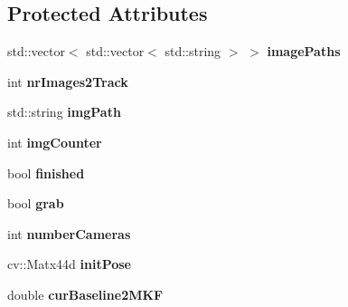 \subsection*{Protected Attributes}
\begin{DoxyCompactItemize}
\item 
std\+::vector$<$ std\+::vector$<$ std\+::string $>$ $>$ {\bfseries image\+Paths}\hypertarget{classMultiColSLAM_1_1cTracking_a0fba31f00a49e1e843390d844c3177c0}{}\label{classMultiColSLAM_1_1cTracking_a0fba31f00a49e1e843390d844c3177c0}

\item 
int {\bfseries nr\+Images2\+Track}\hypertarget{classMultiColSLAM_1_1cTracking_a69cbd301b745115cda11877f5b8ccd51}{}\label{classMultiColSLAM_1_1cTracking_a69cbd301b745115cda11877f5b8ccd51}

\item 
std\+::string {\bfseries img\+Path}\hypertarget{classMultiColSLAM_1_1cTracking_a2fd8655984d8792f9094143d95f3d0d2}{}\label{classMultiColSLAM_1_1cTracking_a2fd8655984d8792f9094143d95f3d0d2}

\item 
int {\bfseries img\+Counter}\hypertarget{classMultiColSLAM_1_1cTracking_a14ec4741c1784ae0032fdd592491c03f}{}\label{classMultiColSLAM_1_1cTracking_a14ec4741c1784ae0032fdd592491c03f}

\item 
bool {\bfseries finished}\hypertarget{classMultiColSLAM_1_1cTracking_a23c35dd952b9f99af75329fb415e021b}{}\label{classMultiColSLAM_1_1cTracking_a23c35dd952b9f99af75329fb415e021b}

\item 
bool {\bfseries grab}\hypertarget{classMultiColSLAM_1_1cTracking_afbf82f34a153a16110b61223dc39b775}{}\label{classMultiColSLAM_1_1cTracking_afbf82f34a153a16110b61223dc39b775}

\item 
int {\bfseries number\+Cameras}\hypertarget{classMultiColSLAM_1_1cTracking_a471d927065f696f4cd6e4a0cf3fe29c8}{}\label{classMultiColSLAM_1_1cTracking_a471d927065f696f4cd6e4a0cf3fe29c8}

\item 
cv\+::\+Matx44d {\bfseries init\+Pose}\hypertarget{classMultiColSLAM_1_1cTracking_a610d1706cfa6ed73afb0556d7a90368c}{}\label{classMultiColSLAM_1_1cTracking_a610d1706cfa6ed73afb0556d7a90368c}

\item 
double {\bfseries cur\+Baseline2\+M\+KF}\hypertarget{classMultiColSLAM_1_1cTracking_a38c6486f94550c6a066abf4c867dda40}{}\label{classMultiColSLAM_1_1cTracking_a38c6486f94550c6a066abf4c867dda40}


\end{DoxyCompactItemize}
